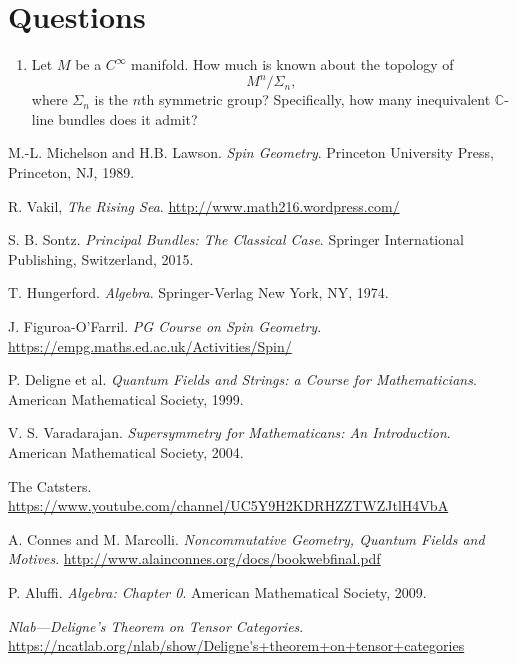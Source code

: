 \documentclass[a4paper]{report}
\newcommand{\C}{\mathbb{C}}
\theoremstyle{definition}
\theoremstyle{plain}
\theoremstyle{remark}
\begin{document}
\chapter{Questions}
\begin{enumerate}
  \item Let $M$ be a $C^{\infty}$ manifold. How much is known about the topology of 
    \begin{equation*}
      M^{n}/\Sigma_{n},
    \end{equation*}
    where $\Sigma_{n}$ is the $n$th symmetric group? Specifically, how many inequivalent $\C$-line bundles does it admit?
\end{enumerate}
\begin{thebibliography}{9}
   M.-L. Michelson and H.B. Lawson.
    \textit{Spin Geometry}.
    Princeton University Press, Princeton, NJ, 1989.

   R. Vakil,
    \textit{The Rising Sea}.
    \url{http://www.math216.wordpress.com/}

   S. B. Sontz.
    \textit{Principal Bundles: The Classical Case}.
    Springer International Publishing, Switzerland, 2015.

   T. Hungerford.
    \textit{Algebra}.
    Springer-Verlag New York, NY, 1974.

   J. Figuroa-O'Farril. 
    \textit{PG Course on Spin Geometry}.
    \url{https://empg.maths.ed.ac.uk/Activities/Spin/}

   P. Deligne et al.
    \textit{Quantum Fields and Strings: a Course for Mathematicians}.
    American Mathematical Society, 1999.

   V. S. Varadarajan.
    \textit{Supersymmetry for Mathematicans: An Introduction}.
    American Mathematical Society, 2004.

   The Catsters.
    \url{https://www.youtube.com/channel/UC5Y9H2KDRHZZTWZJtlH4VbA}

   A. Connes and M. Marcolli.
    \textit{Noncommutative Geometry, Quantum Fields and Motives}.
    \url{http://www.alainconnes.org/docs/bookwebfinal.pdf}

   P. Aluffi.
    \textit{Algebra: Chapter 0}.
    American Mathematical Society, 2009.

    \textit{Nlab---Deligne's Theorem on Tensor Categories}.
    \url{https://ncatlab.org/nlab/show/Deligne's+theorem+on+tensor+categories}


\end{thebibliography}
\end{document}
